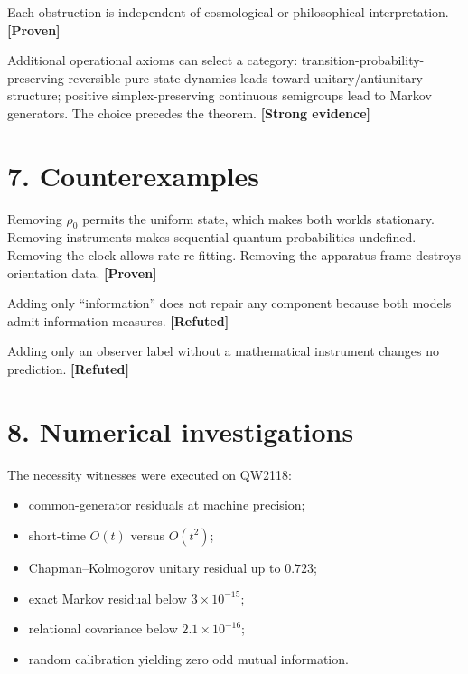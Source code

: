 \documentclass[11pt,a4paper,openany]{report}
\newcommand{\statusProven}{\textcolor{fingreen}{[Proven]}}
\newcommand{\statusStrong}{\textcolor{finblue}{[Strong evidence]}}
\newcommand{\statusRefuted}{\textcolor{finred}{[Refuted]}}
\begin{document}
Each obstruction is independent of cosmological or philosophical interpretation. \textbf{\statusProven{}}

Additional operational axioms can select a category: transition-probability-preserving reversible pure-state dynamics leads toward unitary/\allowbreak{}antiunitary structure; positive simplex-preserving continuous semigroups lead to Markov generators. The choice precedes the theorem. \textbf{\statusStrong{}}

\section{7. Counterexamples}

Removing \(\rho_0\) permits the uniform state, which makes both worlds stationary. Removing instruments makes sequential quantum probabilities undefined. Removing the clock allows rate re-fitting. Removing the apparatus frame destroys orientation data. \textbf{\statusProven{}}

Adding only “information” does not repair any component because both models admit information measures. \textbf{\statusRefuted{}}

Adding only an observer label without a mathematical instrument changes no prediction. \textbf{\statusRefuted{}}

\section{8. Numerical investigations}

The necessity witnesses were executed on QW2118:

\begin{itemize}
\item 
common-generator residuals at machine precision;

\item 
short-time \(O(t)\) versus \(O(t^2)\);

\item 
Chapman–Kolmogorov unitary residual up to \(0.723\);

\item 
exact Markov residual below \(3\times10^{-15}\);

\item 
relational covariance below \(2.1\times10^{-16}\);

\item 
random calibration yielding zero odd mutual information.

\end{itemize}
\end{document}
